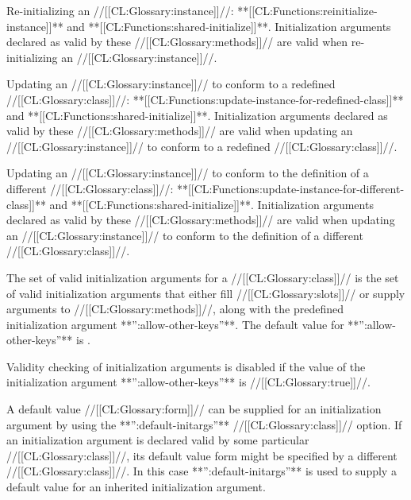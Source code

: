 \itemitem{--} Re-initializing an //[[CL:Glossary:instance]]//: **[[CL:Functions:reinitialize-instance]]** and **[[CL:Functions:shared-initialize]]**. Initialization arguments declared as valid by these //[[CL:Glossary:methods]]// are valid when re-initializing an //[[CL:Glossary:instance]]//.

\itemitem{--}  Updating an //[[CL:Glossary:instance]]// to conform to a redefined //[[CL:Glossary:class]]//: **[[CL:Functions:update-instance-for-redefined-class]]** and **[[CL:Functions:shared-initialize]]**. Initialization arguments declared as valid by these //[[CL:Glossary:methods]]// are valid when updating an //[[CL:Glossary:instance]]// to conform to a redefined //[[CL:Glossary:class]]//.

\itemitem{--} Updating an //[[CL:Glossary:instance]]// to conform to the definition of a different //[[CL:Glossary:class]]//: **[[CL:Functions:update-instance-for-different-class]]** and **[[CL:Functions:shared-initialize]]**. Initialization arguments declared as valid by these //[[CL:Glossary:methods]]// are valid when updating an //[[CL:Glossary:instance]]// to conform to the definition of a different //[[CL:Glossary:class]]//.

\endlist \endlist

The set of valid initialization arguments for a //[[CL:Glossary:class]]// is the set of valid initialization arguments that either fill //[[CL:Glossary:slots]]// or supply arguments to //[[CL:Glossary:methods]]//, along with the predefined initialization argument **'':allow-other-keys''**.  The default value for  **'':allow-other-keys''** is \nil. 

Validity checking of initialization arguments is disabled if the value of the initialization argument **'':allow-other-keys''** is //[[CL:Glossary:true]]//.

\endsubsection%


A default value //[[CL:Glossary:form]]// can be supplied for an initialization argument by using the **'':default-initargs''** //[[CL:Glossary:class]]// option.  If an initialization argument is declared valid by some particular //[[CL:Glossary:class]]//, its default  value form might be specified by a different //[[CL:Glossary:class]]//.  In this case **'':default-initargs''** is used to supply a default value for an inherited initialization argument.

